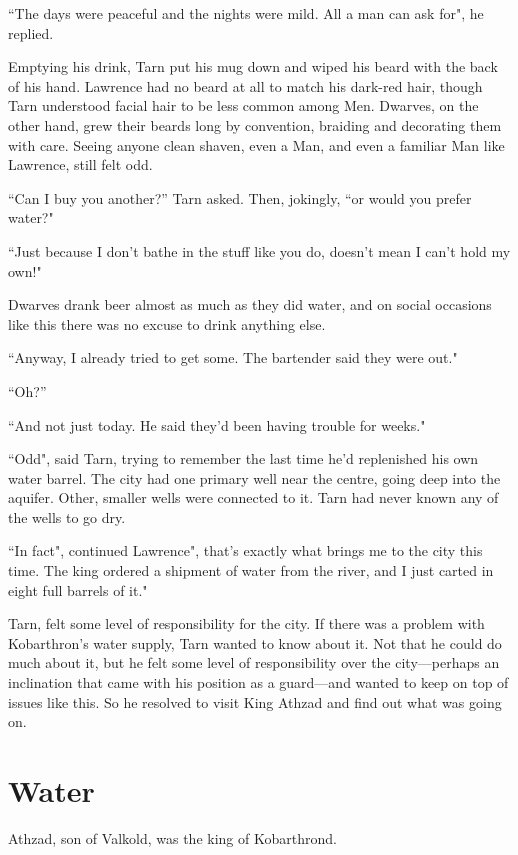 ``The days were peaceful and the nights were mild.  All a man can ask for", he replied.

Emptying his drink, Tarn put his mug down and wiped his beard with the back of his hand.  Lawrence had no beard at all to match his dark-red hair, though Tarn understood facial hair to be less common among Men.  Dwarves, on the other hand, grew their beards long by convention, braiding and decorating them with care.  Seeing anyone clean shaven, even a Man, and even a familiar Man like Lawrence, still felt odd.

``Can I buy you another?'' Tarn asked.  Then, jokingly, ``or would you prefer water?"

``Just because I don't bathe in the stuff like you do, doesn't mean I can't hold my own!"

Dwarves drank beer almost as much as they did water, and on social occasions like this there was no excuse to drink anything else.

``Anyway, I already tried to get some.  The bartender said they were out."

``Oh?''

``And not just today.  He said they'd been having trouble for weeks."

``Odd", said Tarn, trying to remember the last time he'd replenished his own water barrel.  The city had one primary well near the centre, going deep into the aquifer.  Other, smaller wells were connected to it.  Tarn had never known any of the wells to go dry.

``In fact", continued Lawrence", that's exactly what brings me to the city this time.  The king ordered a shipment of water from the river, and I just carted in eight full barrels of it."

Tarn, felt some level of responsibility for the city.  If there was a problem with Kobarthron's water supply, Tarn wanted to know about it.  Not that he could do much about it, but he felt some level of responsibility over the city---perhaps an inclination that came with his position as a guard---and wanted to keep on top of issues like this.  So he resolved to visit King Athzad and find out what was going on.

\chapter{Water}
Athzad, son of Valkold, was the king of Kobarthrond.